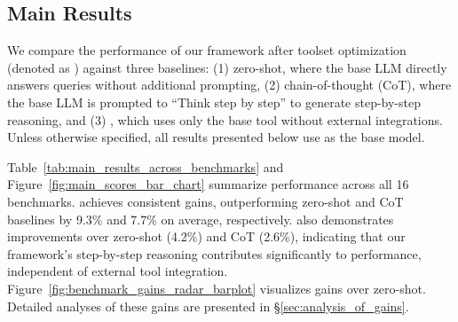 \subsection{Main Results}

We compare the performance of our framework after toolset optimization (denoted as \model) against three baselines: (1) zero-shot, where the base LLM directly answers queries without additional prompting, (2) chain-of-thought (CoT), where the base LLM is prompted to ``Think step by step'' to generate step-by-step reasoning, and (3) \modelbase, which uses only the base tool without external integrations. Unless otherwise specified, all results presented below use \gptengine as the base model.

Table~\ref{tab:main_results_across_benchmarks} and Figure~\ref{fig:main_scores_bar_chart} summarize performance across all 16 benchmarks. \model achieves consistent gains, outperforming zero-shot and CoT baselines by 9.3\% and 7.7\% on average, respectively. \modelbase also demonstrates improvements over zero-shot (4.2\%) and CoT (2.6\%), indicating that our framework's step-by-step reasoning contributes significantly to performance, independent of external tool integration. Figure~\ref{fig:benchmark_gains_radar_barplot} visualizes gains over zero-shot. Detailed analyses of these gains are presented in \S \ref{sec:analysis_of_gains}. 

